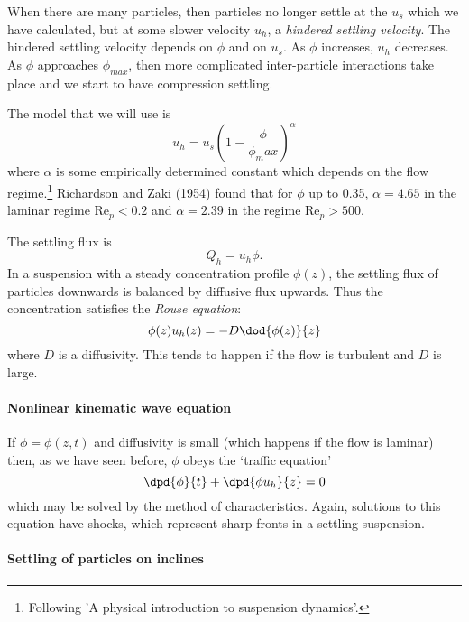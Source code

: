 When there are many particles, then particles no longer settle at the $u_s$ which we have calculated, but at some slower velocity $u_h$, a \textit{hindered settling velocity}. The hindered settling velocity depends on $\phi$ and on $u_s$. As $\phi$ increases, $u_h$ decreases. As $\phi$ approaches $\phi_{max}$, then more complicated inter-particle interactions take place and we start to have compression settling. 

The model that we will use is 
\begin{equation}
	u_h = u_s \left( 1 - \frac{\phi}{\phi_max} \right)^\alpha
\end{equation}
where $\alpha$ is some empirically determined constant which depends on the flow regime.\footnote{Following 'A physical introduction to suspension dynamics'.} Richardson and Zaki (1954) found that for $\phi$ up to 0.35, $\alpha = 4.65$ in the laminar regime $\mathrm{Re}_p < 0.2$ and $\alpha = 2.39$ in the regime $\mathrm{Re}_p > 500$. 

The settling flux is
\begin{equation}
	Q_h = u_h \phi.
\end{equation}
In a suspension with a steady concentration profile $\phi(z)$, the settling flux of particles downwards is balanced by diffusive flux upwards. Thus the concentration satisfies the \textit{Rouse equation}:
\begin{equation}
	\phi(z) u_h(z) = -D \dod{\phi(z)}{z}
\end{equation}
where $D$ is a diffusivity. This tends to happen if the flow is turbulent and $D$ is large.

\paragraph{Nonlinear kinematic wave equation}
If $\phi = \phi(z,t)$ and diffusivity is small (which happens if the flow is laminar) then, as we have seen before, $\phi$ obeys the `traffic equation'
\begin{equation}
	\dpd{\phi}{t} + \dpd{\phi u_h}{z} = 0
\end{equation}
which may be solved by the method of characteristics. Again, solutions to this equation have shocks, which represent sharp fronts in a settling suspension.

\paragraph{Settling of particles on inclines}

